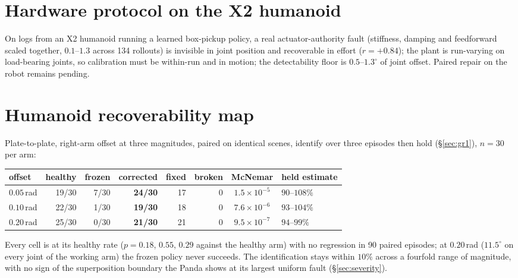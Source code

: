 \documentclass{article}
\begin{document}
\section{Hardware protocol on the X2 humanoid}
\label{app:hw}
On logs from an X2 humanoid running a learned box-pickup policy, a real actuator-authority
fault (stiffness, damping and feedforward scaled together, $0.1$--$1.3$ across 134
rollouts) is invisible in joint position and recoverable in effort ($r=+0.84$); the plant
is run-varying on load-bearing joints, so calibration must be within-run and in motion; the
detectability floor is $0.5$--$1.3^\circ$ of joint offset. Paired repair on
the robot remains pending.

\section{Humanoid recoverability map}
\label{app:gr1map}
Plate-to-plate, right-arm offset at three magnitudes, paired on identical scenes, identify
over three episodes then hold (\S\ref{sec:gr1}), $n=30$ per arm:

\begin{center}\small
\begin{tabular}{lrrrrrcl}
\toprule
offset & healthy & frozen & corrected & fixed & broken & McNemar & held estimate \\
\midrule
$0.05$\,rad & 19/30 & 7/30 & \textbf{24/30} & 17 & 0 & $1.5\times10^{-5}$ & $90$--$108\%$ \\
$0.10$\,rad & 22/30 & 1/30 & \textbf{19/30} & 18 & 0 & $7.6\times10^{-6}$ & $93$--$104\%$ \\
$0.20$\,rad & 25/30 & 0/30 & \textbf{21/30} & 21 & 0 & $9.5\times10^{-7}$ & $94$--$99\%$ \\
\bottomrule
\end{tabular}
\end{center}

Every cell is at its healthy rate ($p=0.18$, $0.55$, $0.29$ against the healthy arm) with no
regression in 90 paired episodes; at $0.20$\,rad ($11.5^\circ$ on every joint of the working
arm) the frozen policy never succeeds. The identification stays within $10\%$ across a
fourfold range of magnitude, with no sign of the superposition boundary the Panda shows at
its largest uniform fault (\S\ref{sec:severity}).
\end{document}
